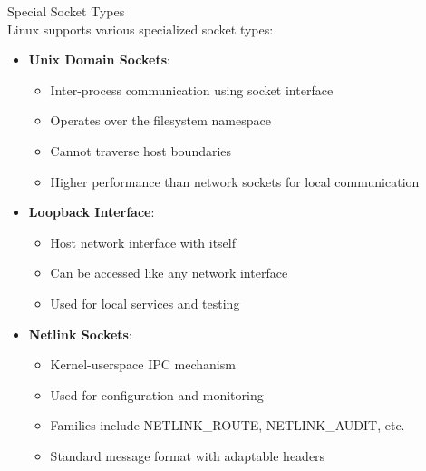 \begin{definition}{Special Socket Types}\\
    Linux supports various specialized socket types:
    \begin{itemize}
        \item \textbf{Unix Domain Sockets}:
            \begin{itemize}
                \item Inter-process communication using socket interface
                \item Operates over the filesystem namespace
                \item Cannot traverse host boundaries
                \item Higher performance than network sockets for local communication
            \end{itemize}
        \item \textbf{Loopback Interface}:
            \begin{itemize}
                \item Host network interface with itself
                \item Can be accessed like any network interface
                \item Used for local services and testing
            \end{itemize}
        \item \textbf{Netlink Sockets}:
            \begin{itemize}
                \item Kernel-userspace IPC mechanism
                \item Used for configuration and monitoring
                \item Families include NETLINK\_ROUTE, NETLINK\_AUDIT, etc.
                \item Standard message format with adaptable headers
            \end{itemize}
    \end{itemize}
\end{definition}

